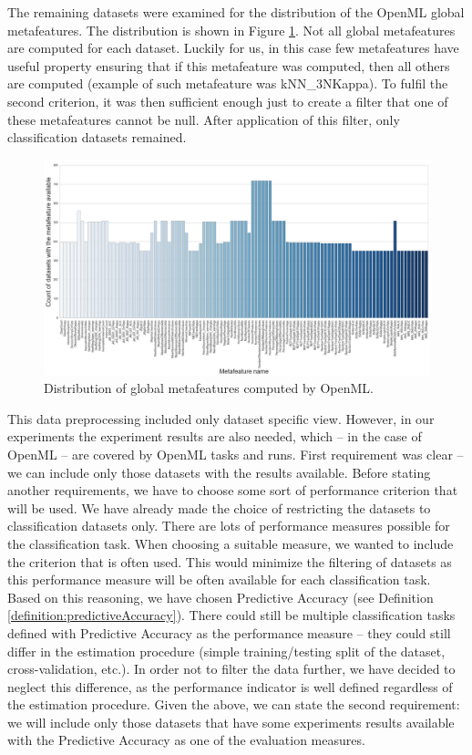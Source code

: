 The remaining datasets were examined for the distribution of the OpenML global metafeatures. The distribution is shown in Figure \ref{fig:globalmetadatadistirbution}. Not all global metafeatures are computed for each dataset. Luckily for us, in this case few metafeatures have useful property ensuring that if this metafeature was computed, then all others are computed (example of such metafeature was  kNN\_3NKappa). To fulfil the second criterion, it was then sufficient enough just to create a filter that one of these metafeatures cannot be null. After application of this filter, only classification datasets remained.

\begin{figure}
	\includegraphics[width=14cm]{Images/OpenMlDataDistributtion.png}
	\centering
	\caption{Distribution of global metafeatures computed by OpenML.}
	\label{fig:globalmetadatadistirbution}	
\end{figure}

This data preprocessing included only dataset specific view. However, in our experiments the experiment results are also needed, which -- in the case of OpenML -- are covered by OpenML tasks and runs. First requirement was clear -- we can include only those datasets with the results available. Before stating another requirements, we have to choose some sort of performance criterion that will be used. We have already made the choice of restricting the datasets to classification datasets only. There are lots of performance measures possible for the classification task. When choosing a suitable measure, we wanted to include the criterion that is often used. This would minimize the filtering of datasets as this performance measure will be often available for each classification task. Based on this reasoning, we have chosen  Predictive Accuracy (see Definition \ref{definition:predictiveAccuracy}). There could still be multiple classification tasks defined with Predictive Accuracy as the performance measure -- they could still differ in the estimation procedure (simple training/testing split of the dataset, cross-validation, etc.). In order not to filter the data further, we have decided to neglect this difference, as the performance indicator is well defined regardless of the estimation procedure. Given the above, we can state the second requirement: we will include only those datasets that have some experiments results available with the Predictive Accuracy as one of the evaluation measures. 

